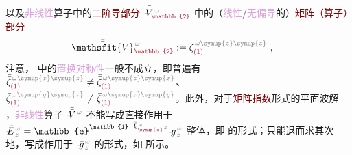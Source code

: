 以及\textcolor{Plum}{非线性}算子中的\textcolor{Maroon}{二阶导部分} $\Xint{\mathcolor{gray}{-}}{21}{\bar{\bar{V}}}^{\;\! \mathcolor{gray}{\omega}}_{\textcolor{Maroon}{\mathbb{2}}}$ 中的（\textcolor{Plum}{线性}/\textcolor{Plum}{无偏导}的）\textcolor{Maroon}{矩阵（算子）部分}
\begin{align} \label{eq:matrix_exp-V2}
	\Xint{\mathcolor{gray}{-}}{25}{\bar{\bar{\mathsfit{V}}}}^{\;\! \mathcolor{gray}{\omega}}_{\textcolor{Maroon}{\mathbb{2}}} := \bar{\bar{\zeta}}^{\;\! \mathcolor{gray}{\omega} \mathcolor{gray}{\symup{z} \symup{z}}}_{\textcolor{Maroon}{(1)}} ~, 
\end{align}
注意， 中的\textcolor{Plum}{置换对称性}一般不成立，即普遍有 $\bar{\bar{\zeta}}^{\;\! \mathcolor{gray}{\omega} \mathcolor{gray}{\symup{x} \symup{z}}}_{\textcolor{Maroon}{(1)}} \neq \bar{\bar{\zeta}}^{\;\! \mathcolor{gray}{\omega} \mathcolor{gray}{\symup{z} \symup{x}}}_{\textcolor{Maroon}{(1)}}$、 $\bar{\bar{\zeta}}^{\;\! \mathcolor{gray}{\omega} \mathcolor{gray}{\symup{y} \symup{z}}}_{\textcolor{Maroon}{(1)}} \neq \bar{\bar{\zeta}}^{\;\! \mathcolor{gray}{\omega} \mathcolor{gray}{\symup{z} \symup{y}}}_{\textcolor{Maroon}{(1)}}$。此外，对于\textcolor{Maroon}{矩阵指数}形式的\textcolor{PineGreen}{平面波}解 ，\textcolor{Plum}{非线性}算子 $\Xint{\mathcolor{gray}{-}}{21}{\bar{\bar{V}}}^{\;\! \mathcolor{gray}{\omega}}$ 不能写成直接作用于 $\Xint{\mathcolor{gray}{-}}{25}{\bar{E}}^{\;\!\mathcolor{gray}{\omega}}_{\;\! \mathcolor{gray}{z}} = \mathbb{e}^{\mathbb{i} \Xint{\begin{smallmatrix} ~ \\ {}^{}_{\mathcolor{gray}{-}} \\ ~ \end{smallmatrix}}{15}{\bar{\bar{k}}}_{\textcolor{Maroon}{\symup{z}}}^{\;\! \mathcolor{gray}{\omega}} \mathcolor{gray}{z}} \Xint{{}^{}_{\mathcolor{gray}{-}}}{10}{\bar{g}}^{\;\!\mathcolor{gray}{\omega}}_{\;\! \mathcolor{gray}{z}}$ 整体，即  的形式；只能退而求其次地，写成作用于 $\Xint{{}^{}_{\mathcolor{gray}{-}}}{10}{\bar{g}}^{\;\!\mathcolor{gray}{\omega}}_{\;\! \mathcolor{gray}{z}}$ 的形式，如  所示。

